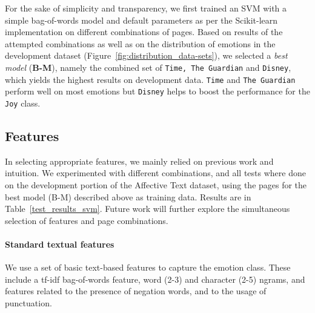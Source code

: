 \documentclass[11pt]{article}
\begin{document}
For the sake of simplicity and transparency, we first trained an SVM with a simple bag-of-words model and default parameters as per the Scikit-learn implementation \cite{scikit-learn} on different combinations of pages. Based on results of the attempted combinations as well as on the distribution of emotions in the development dataset (Figure~\ref{fig:distribution_data-sets}), we selected a \textit{best model} (\textbf{B-M}), namely the combined set of \texttt{Time, The Guardian} and \texttt{Disney}, which yields the highest results on development data. \texttt{Time} and \texttt{The Guardian} perform well on most emotions but \texttt{Disney} helps to boost the performance for the \texttt{Joy} class.


\subsection{Features}
In selecting appropriate features, we mainly relied on previous work and intuition. We experimented with different combinations, and all tests where done on the development portion of the Affective Text dataset, using the pages for the best model (B-M) described above as training data. %
Results are in Table~\ref{test_results_svm}.
Future work will further explore the simultaneous selection of features and page combinations.




\paragraph{Standard textual features} We use a set of basic text-based features to capture the emotion class. These include a tf-idf bag-of-words feature, word (2-3) and character (2-5) ngrams, and features related to the presence of negation words, and to the usage of punctuation.

\end{document}
